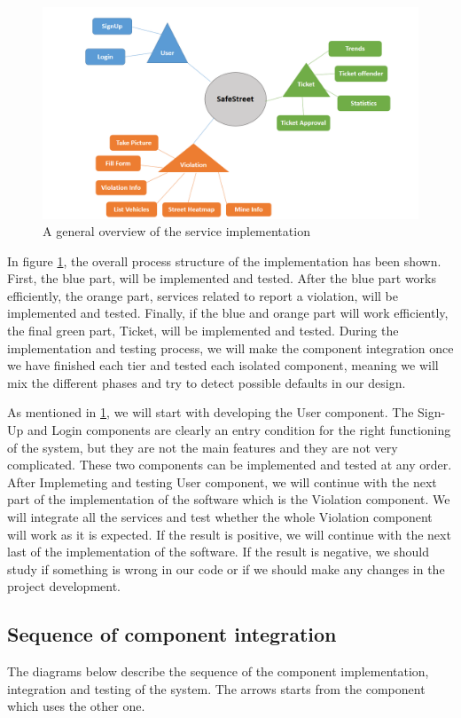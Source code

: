 \begin{figure}
\centering
\includegraphics[width=\textwidth]{Images/ImplemetationandTest.png}
\caption{\label{fig:Test} A general overview of the service implementation}
\end{figure}

In ﬁgure \ref{fig:Test}, the overall process structure of the implementation has been shown. First, the blue part, will be implemented and tested. After the blue part works efficiently, the orange part, services related to report a violation, will be implemented and tested. Finally, if the blue and orange part will work efficiently, the ﬁnal green part, Ticket, will be implemented and tested. During the implementation and testing process, we will make the component integration once we have ﬁnished each tier and tested each isolated component, meaning we will mix the different phases and try to detect possible defaults in our design.

As mentioned in \ref{fig:Test}, we will start with developing the User component. The Sign-Up and Login components are clearly an entry condition for the right functioning of the system, but they are not the main features and they are not very complicated. These two components can be implemented and tested at any order. After Implemeting and testing User component, we will continue with the next part of the implementation of the software which is the Violation component. We will integrate all the services and test whether the whole Violation component will work as it is expected. If the result is positive, we will continue with the next last of the implementation of the software. If the result is negative, we should study if something is wrong in our code or if we should make any changes in the project development.

\subsection{Sequence of component integration}
The diagrams below describe the sequence of the component implementation, integration and testing of the system. The arrows starts from the component which uses the other one.

